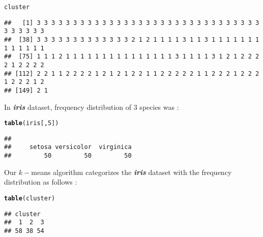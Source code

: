 \documentclass[11pt, a4paper]{article}\usepackage[]{graphicx}\usepackage[]{xcolor}
\makeatletter
\newcommand{\hlnum}[1]{\textcolor[rgb]{0.686,0.059,0.569}{#1}}%
\newcommand{\hldef}[1]{\textcolor[rgb]{0.345,0.345,0.345}{#1}}%
\newcommand{\hlkwd}[1]{\textcolor[rgb]{0.737,0.353,0.396}{\textbf{#1}}}%
\newenvironment{kframe}{%
 \def\at@end@of@kframe{}%
 \ifinner\ifhmode%
  \def\at@end@of@kframe{\end{minipage}}%
  \begin{minipage}{\columnwidth}%
 \fi\fi%
 \def\FrameCommand##1{\hskip\@totalleftmargin \hskip-\fboxsep
 \colorbox{shadecolor}{##1}\hskip-\fboxsep
     \hskip-\linewidth \hskip-\@totalleftmargin \hskip\columnwidth}%
 \MakeFramed {\advance\hsize-\width
   \@totalleftmargin\z@ \linewidth\hsize
   \@setminipage}}%
 {\par\unskip\endMakeFramed%
 \at@end@of@kframe}
\newenvironment{knitrout}{}{} %
\makeatother
\begin{document}
\begin{knitrout}
\color{fgcolor}\begin{kframe}
\begin{alltt}
\hldef{cluster}
\end{alltt}
\begin{verbatim}
##   [1] 3 3 3 3 3 3 3 3 3 3 3 3 3 3 3 3 3 3 3 3 3 3 3 3 3 3 3 3 3 3 3 3 3 3 3 3 3
##  [38] 3 3 3 3 3 3 3 3 3 3 3 3 3 2 1 2 1 1 1 1 3 1 1 3 1 1 1 1 1 1 1 1 1 1 1 1 1
##  [75] 1 1 1 2 1 1 1 1 1 1 1 1 1 1 1 1 1 1 1 3 1 1 1 1 3 1 2 1 2 2 2 2 1 2 2 2 2
## [112] 2 2 1 1 2 2 2 2 1 2 1 2 1 2 2 1 1 2 2 2 2 2 1 1 2 2 2 1 2 2 2 1 2 2 2 1 2
## [149] 2 1
\end{verbatim}
\end{kframe}
\end{knitrout}

In \textbf{\textit{iris}} dataset, frequency distribution of 3 species was :

\begin{knitrout}
\color{fgcolor}\begin{kframe}
\begin{alltt}
\hlkwd{table}\hldef{(iris[,}\hlnum{5}\hldef{])}
\end{alltt}
\begin{verbatim}
## 
##     setosa versicolor  virginica 
##         50         50         50
\end{verbatim}
\end{kframe}
\end{knitrout}

Our $k-$means algorithm categorizes the \textbf{\textit{iris}} dataset with the frequency distribution as follows :

\begin{knitrout}
\color{fgcolor}\begin{kframe}
\begin{alltt}
\hlkwd{table}\hldef{(cluster)}
\end{alltt}
\begin{verbatim}
## cluster
##  1  2  3 
## 58 38 54
\end{verbatim}
\end{kframe}
\end{knitrout}
\end{document}
